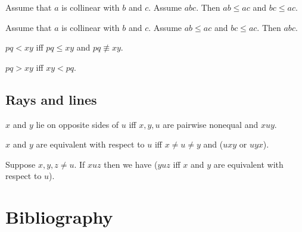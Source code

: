 \documentclass[10pt,a4paper,parskip=half,numbers=endperiod,headings=standardclasses,parskip]{scrartcl}
\newcommand{\NotCong}[4]{#1 #2 \not\equiv #3 #4}
\newcommand{\Betw}[3]{#1 #2 #3}
\newcommand{\Leq}[4]{#1 #2 \leq #3 #4}
\newcommand{\Less}[4]{#1 #2 < #3 #4}
\newcommand{\Greater}[4]{#1 #2 > #3 #4}
\begin{document}
\begin{forthel}
    \begin{lemma} %
      Assume that $a$ is collinear with $b$ and $c$.
      Assume $\Betw{a}{b}{c}$.
      Then $\Leq{a}{b}{a}{c}$ and $\Leq{b}{c}{a}{c}$.
    \end{lemma}

    \begin{lemma} %
      Assume that $a$ is collinear with $b$ and $c$.
      Assume $\Leq{a}{b}{a}{c}$ and $\Leq{b}{c}{a}{c}$.
      Then $\Betw{a}{b}{c}$.
    \end{lemma}
  \end{forthel}


  \begin{forthel}
    \begin{definition}
      $\Less{p}{q}{x}{y}$ iff $\Leq{p}{q}{x}{y}$ and $\NotCong{p}{q}{x}{y}$.
    \end{definition}

    \begin{definition}
      $\Greater{p}{q}{x}{y}$ iff $\Less{x}{y}{p}{q}$.
    \end{definition}
  \end{forthel}



  \subsection{Rays and lines}

  \begin{forthel}
    \begin{definition}
      $x$ and $y$ lie on opposite sides of $u$ iff
      $x, y, u$ are pairwise nonequal and $\Betw{x}{u}{y}$.
    \end{definition}

    \begin{definition}
      $x$ and $y$ are equivalent with respect to $u$ iff $x\neq u \neq y$ and ($\Betw{u}{x}{y}$ or $\Betw{u}{y}{x}$).
    \end{definition}

    \begin{lemma}
      Suppose $x,y,z \neq u$.
      If $\Betw{x}{u}{z}$
      then we have
        ($\Betw{y}{u}{z}$ iff $x$ and $y$ are equivalent with respect to $u$).
    \end{lemma}
  \end{forthel}

  \appendix
  \section*{Bibliography}
\end{document}
